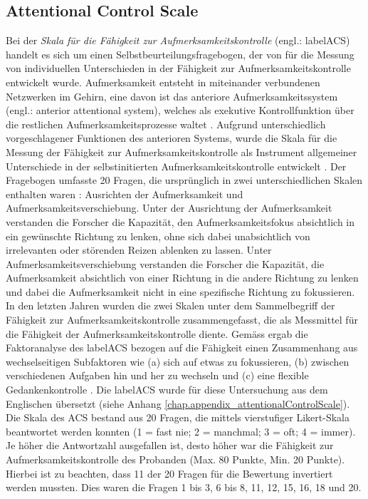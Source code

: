 \subsection{Attentional Control Scale} \label{subsection.acs}
Bei der \textit{Skala für die Fähigkeit zur Aufmerksamkeitskontrolle} (engl.: \gls{labelACS}) handelt es sich um einen Selbstbeurteilungsfragebogen, der von  für die Messung von individuellen Unterschieden in der Fähigkeit zur Aufmerksamkeitskontrolle entwickelt wurde. Aufmerksamkeit entsteht in miteinander verbundenen Netzwerken im Gehirn, eine davon ist das anteriore Aufmerksamkeitssystem (engl.: anterior attentional system), welches als exekutive Kontrollfunktion über die restlichen Aufmerksamkeitsprozesse waltet \cite{Posner1998}. Aufgrund unterschiedlich vorgeschlagener Funktionen des anterioren Systems, wurde die Skala für die Messung der Fähigkeit zur Aufmerksamkeitskontrolle als Instrument allgemeiner Unterschiede in der selbstinitierten Aufmerksamkeitskontrolle entwickelt \cite{Derryberry2001}. Der Fragebogen umfasste 20 Fragen, die ursprünglich in zwei unterschiedlichen Skalen enthalten waren \cite{Derryberry1988}: Ausrichten der Aufmerksamkeit und Aufmerksamkeitsverschiebung. Unter der Ausrichtung der Aufmerksamkeit verstanden die Forscher die Kapazität, den Aufmerksamkeitsfokus absichtlich in ein gewünschte Richtung zu lenken, ohne sich dabei unabsichtlich von irrelevanten oder störenden Reizen ablenken zu lassen. Unter Aufmerksamkeitsverschiebung verstanden die Forscher die Kapazität, die Aufmerksamkeit absichtlich von einer Richtung in die andere Richtung zu lenken und dabei die Aufmerksamkeit nicht in eine spezifische Richtung zu fokussieren. In den letzten Jahren wurden die zwei Skalen unter dem Sammelbegriff der Fähigkeit zur Aufmerksamkeitskontrolle zusammengefasst, die als Messmittel für die Fähigkeit der Aufmerksamkeitskontrolle diente. Gemäss  ergab die Faktoranalyse des \gls{labelACS} bezogen auf die Fähigkeit einen Zusammenhang aus wechselseitigen Subfaktoren wie (a) sich auf etwas zu fokussieren, (b) zwischen verschiedenen Aufgaben hin und her zu wechseln und (c) eine flexible Gedankenkontrolle \cite{Derryberry2002}. Die \gls{labelACS} wurde für diese Untersuchung aus dem Englischen übersetzt (siehe Anhang \ref{chap.appendix_attentionalControlScale}). Die Skala des ACS bestand aus 20 Fragen, die mittels vierstufiger Likert-Skala beantwortet werden konnten (1 = fast nie; 2 = manchmal; 3 = oft; 4 = immer). Je höher die Antwortzahl ausgefallen ist, desto höher war die Fähigkeit zur Aufmerksamkeitskontrolle des Probanden (Max. 80 Punkte, Min. 20 Punkte). Hierbei ist zu beachten, dass 11 der 20 Fragen für die Bewertung invertiert werden mussten. Dies waren die Fragen 1 bis 3, 6 bis 8, 11, 12, 15, 16, 18 und 20.

